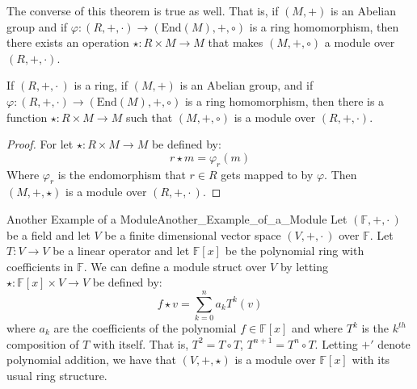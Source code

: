     The converse of this theorem is true as well. That is, if
    $(M,\boldsymbol{+})$ is an Abelian group and if
    $\varphi:(R,+,\cdot)\rightarrow(\textrm{End}(M),\boldsymbol{+},\circ)$ is
    a ring homomorphism, then there exists an operation
    $\star:R\times{M}\rightarrow{M}$ that makes $(M,\boldsymbol{+},\circ)$ a
    module over $(R,+,\cdot)$.
    \begin{theorem}
        If $(R,+,\cdot\,)$ is a ring, if $(M,\boldsymbol{+})$ is an Abelian
        group, and if
        $\varphi:(R,+,\cdot)\rightarrow(\textrm{End}(M),\boldsymbol{+},\circ)$
        is a ring homomorphism, then there is a function
        $\star:R\times{M}\rightarrow{M}$ such that $(M,\boldsymbol{+},\circ)$ is
        a module over $(R,+,\cdot)$.
    \end{theorem}
    \begin{proof}
        For let $\star:R\times{M}\rightarrow{M}$ be defined by:
        \begin{equation}
            r\star{m}=\varphi_{r}(m)
        \end{equation}
        Where $\varphi_{r}$ is the endomorphism that $r\in{R}$ gets mapped to
        by $\varphi$. Then $(M,\boldsymbol{+},\star)$ is a module over
        $(R,+,\cdot\,)$.
    \end{proof}
    \begin{lexample}{Another Example of a Module}{Another_Example_of_a_Module}
        Let $(\mathbb{F},+,\cdot\,)$ be a field and let $V$ be a finite
        dimensional vector space $(V,\boldsymbol{+},\boldsymbol{\cdot}\,)$ over
        $\mathbb{F}$. Let $T:V\rightarrow{V}$ be a linear operator and let
        $\mathbb{F}[x]$ be the polynomial ring with coefficients in
        $\mathbb{F}$. We can define a module struct over $V$ by letting
        $\star:\mathbb{F}[x]\times{V}\rightarrow{V}$ be defined by:
        \begin{equation}
            f\star{v}=\sum_{k=0}^{n}a_{k}T^{k}(v)
        \end{equation}
        where $a_{k}$ are the coefficients of the polynomial $f\in\mathbb{F}[x]$
        and where $T^{k}$ is the $k^{th}$ composition of $T$ with itself. That
        is, $T^{2}=T\circ{T}$, $T^{n+1}=T^{n}\circ{T}$. Letting
        $\boldsymbol{+}'$ denote polynomial addition, we have that
        $(V,\boldsymbol{+},\star)$ is a module over $\mathbb{F}[x]$ with its
        usual ring structure.
    \end{lexample}
